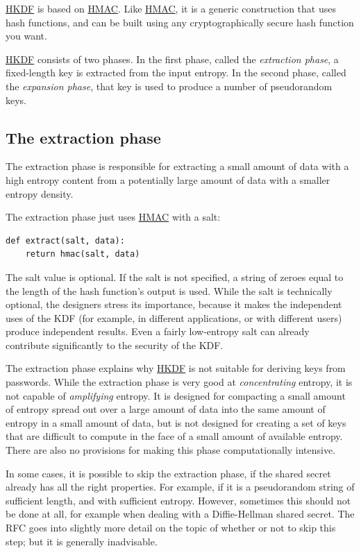 \documentclass[11pt,ebook,table,dvipsnames]{memoir}
\begin{document}
\hyperref[HKDF]{HKDF} is based on \hyperref[HMAC]{HMAC}. Like \hyperref[HMAC]{HMAC}, it is a generic construction that
uses hash functions, and can be built using any cryptographically
secure hash function you want.

\hyperref[HKDF]{HKDF} consists of two phases. In the first phase, called the
\emph{extraction phase}, a fixed-length key is extracted from the input
entropy. In the second phase, called the \emph{expansion phase}, that key
is used to produce a number of pseudorandom keys.

\subsection{The extraction phase}
\label{sec-2-9-6-1}

The extraction phase is responsible for extracting a small amount of
data with a high entropy content from a potentially large amount of
data with a smaller entropy density.

The extraction phase just uses \hyperref[HMAC]{HMAC} with a salt:

\begin{verbatim}
def extract(salt, data):
    return hmac(salt, data)
\end{verbatim}

The salt value is optional. If the \gls{salt} is not specified, a
string of zeroes equal to the length of the hash function's output is
used. While the salt is technically optional, the designers stress its
importance, because it makes the independent uses of the KDF (for
example, in different applications, or with different users) produce
independent results. Even a fairly low-entropy salt can already
contribute significantly to the security of the KDF. \cite{rfc5869}
\cite{hkdf}

The extraction phase explains why \hyperref[HKDF]{HKDF} is not suitable for deriving
keys from passwords. While the extraction phase is very good at
\emph{concentrating} entropy, it is not capable of \emph{amplifying} entropy. It
is designed for compacting a small amount of entropy spread out over a
large amount of data into the same amount of entropy in a small amount
of data, but is not designed for creating a set of keys that are
difficult to compute in the face of a small amount of available
entropy. There are also no provisions for making this phase
computationally intensive. \cite{rfc5869}

In some cases, it is possible to skip the extraction phase, if the
shared secret already has all the right properties. For example, if it
is a pseudorandom string of sufficient length, and with sufficient
entropy. However, sometimes this should not be done at all, for
example when dealing with a Diffie-Hellman shared secret. The RFC goes
into slightly more detail on the topic of whether or not to skip this
step; but it is generally inadvisable. \cite{rfc5869}
\end{document}
